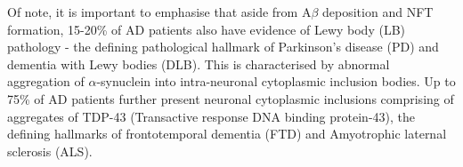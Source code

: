 Of note, it is important to emphasise that aside from A$\beta$ deposition and NFT formation, 15-20\% of AD patients also have evidence of Lewy body (LB) pathology \cite{C1995,L2003} - the defining pathological hallmark of Parkinson's disease (PD)\cite{Wakabayashi2007} and dementia with Lewy bodies (DLB)\cite{Spillantini1997}. This is characterised by abnormal aggregation of $\alpha$-synuclein into intra-neuronal cytoplasmic inclusion bodies. Up to 75\% of AD patients further present neuronal cytoplasmic inclusions comprising of aggregates of TDP-43 \cite{King2010,McAleese2017,Arai2009} (Transactive response DNA binding protein-43), the defining hallmarks of frontotemporal dementia (FTD) and Amyotrophic laternal sclerosis\cite{Pesiridis2009} (ALS).

